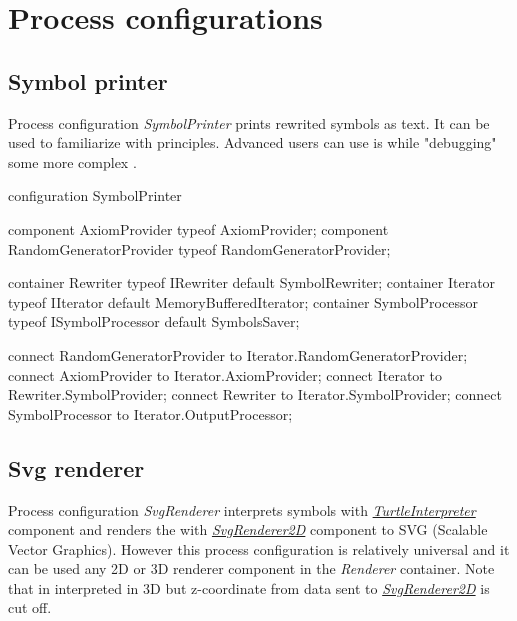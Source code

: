 \section{Process configurations}
\label{sec:stdLibProcessConfigurations}

\subsection{Symbol printer}
\label{sec:stdLibSymbolPrinter}

Process configuration \emph{SymbolPrinter} prints rewrited symbols as text.
It can be used to familiarize with \lsystem principles.
Advanced users can use is while "debugging" some more complex \lsystem.

\begin{LsystemBreak}
configuration SymbolPrinter {
	component AxiomProvider typeof AxiomProvider;
	component RandomGeneratorProvider
		typeof RandomGeneratorProvider;

	container Rewriter typeof IRewriter default SymbolRewriter;
	container Iterator typeof IIterator
		default MemoryBufferedIterator;
	container SymbolProcessor typeof ISymbolProcessor
		default SymbolsSaver;

	connect RandomGeneratorProvider
		to Iterator.RandomGeneratorProvider;
	connect AxiomProvider to Iterator.AxiomProvider;
	connect Iterator to Rewriter.SymbolProvider;
	connect Rewriter to Iterator.SymbolProvider;
	connect SymbolProcessor to Iterator.OutputProcessor;
}
\end{LsystemBreak}


\subsection{Svg renderer}
\label{configurationSvgRenderer}

Process configuration \emph{SvgRenderer} interprets symbols with \hyperref[Malsys.Processing.Components.Interpreters.TurtleInterpreter]{\emph{TurtleInterpreter}} component
	and renders the with \hyperref[Malsys.Processing.Components.Renderers.SvgRenderer2D]{\emph{SvgRenderer2D}} component to SVG (Scalable Vector Graphics).
However this process configuration is relatively universal and it can be used any 2D or 3D renderer component in the \emph{Renderer} container.
Note that \lsystem in interpreted in 3D but z-coordinate from data sent to \hyperref[Malsys.Processing.Components.Renderers.SvgRenderer2D]{\emph{SvgRenderer2D}} is cut off.


